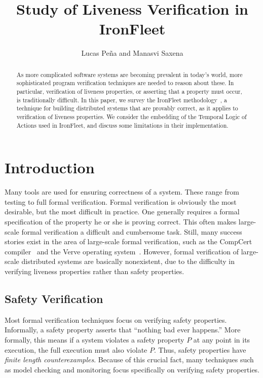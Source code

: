 \documentclass{llncs}
\begin{document}
%
\mainmatter              %
%
\title{Study of Liveness Verification in IronFleet}
%
\author{Lucas Pe\~{n}a and Manasvi Saxena}
%

\maketitle              %

\begin{abstract}
  As more complicated software systems are becoming prevalent in today's world,
  more sophisticated program verification techniques are needed to reason about
  these. In particular, verification of liveness properties, or asserting that a
  property must occur, is traditionally difficult. In this paper, we survey the
  IronFleet methodology~\cite{ironfleet}, a technique for building distributed
  systems that are provably correct, as it applies to verification of liveness
  properties. We consider the embedding of the Temporal Logic of Actions used in
  IronFleet, and discuss some limitations in their implementation.
\end{abstract}
%
\section{Introduction}
Many tools are used for ensuring correctness of a system. These range from
testing to full formal verification. Formal verification is obviously the most
desirable, but the most difficult in practice. One generally requires a formal
specification of the property he or she is proving correct. This often makes
large-scale formal verification a difficult and cumbersome task. Still, many
success stories exist in the area of large-scale formal verification, such as
the CompCert compiler~\cite{compcert} and the Verve operating
system~\cite{verve}. However, formal verification of large-scale distributed
systems are basically nonexistent, due to the difficulty in verifying liveness
properties rather than safety properties.

\subsection{Safety Verification}
Most formal verification techniques focus on verifying safety
properties. Informally, a safety property asserts that ``nothing bad ever
happens.'' More formally, this means if a system violates a safety property $P$
at any point in its execution, the full execution must also violate $P$. Thus,
safety properties have \textit{finite length counterexamples}. Because of this
crucial fact, many techniques such as model checking and monitoring focus
specifically on verifying safety properties.
\end{document}
